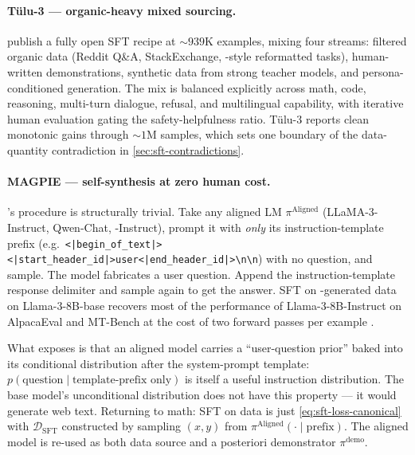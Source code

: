 \paragraph{T\"ulu-3 — organic-heavy mixed sourcing.} \citet{tulu3}
publish a fully open SFT recipe at $\sim\!939$K examples, mixing four
streams: filtered organic data (Reddit Q\&A, StackExchange, -style
reformatted tasks), human-written demonstrations, synthetic data from
strong teacher models, and persona-conditioned generation. The mix is
balanced explicitly across math, code, reasoning, multi-turn dialogue,
refusal, and multilingual capability, with iterative human evaluation
gating the safety-helpfulness ratio. T\"ulu-3 reports clean monotonic
gains through $\sim\!1$M samples, which sets one boundary of the
data-quantity contradiction in \cref{sec:sft-contradictions}.

\paragraph{MAGPIE — self-synthesis at zero human cost.}
\citet{magpie-2024}'s procedure is structurally trivial. Take any
aligned LM $\pi^{\mathrm{Aligned}}$ (LLaMA-3-Instruct, Qwen-Chat,
-Instruct), prompt it with \emph{only} its instruction-template
prefix (e.g.\
\texttt{<|begin\_of\_text|>}\allowbreak\texttt{<|start\_header\_id|>}\allowbreak\texttt{user}\allowbreak\texttt{<|end\_header\_id|>}\allowbreak\texttt{\textbackslash n\textbackslash n})
with no question, and sample. The model fabricates a user question.
Append the instruction-template response delimiter and sample again to
get the answer. SFT on \glsterm{magpie}{MAGPIE}-generated data on Llama-3-8B-base
recovers most of the performance of Llama-3-8B-Instruct on AlpacaEval
and MT-Bench at the cost of two forward passes per example
\citep{magpie-2024}.

\begin{intuition}
What  exposes is that an aligned model carries a
``user-question prior'' baked into its conditional distribution after
the system-prompt template: $p(\text{question} \mid
\text{template-prefix only})$ is itself a useful instruction
distribution. The base model's unconditional distribution does not
have this property — it would generate web text. Returning to math:
SFT on \glsterm{magpie}{MAGPIE} data is just \cref{eq:sft-loss-canonical} with
$\mathcal{D}_{\mathrm{SFT}}$ constructed by sampling $(x, y)$ from
$\pi^{\mathrm{Aligned}}(\cdot \mid \text{prefix})$. The aligned model is
re-used as both data source and a posteriori demonstrator
$\pi^{\mathrm{demo}}$.
\end{intuition}

